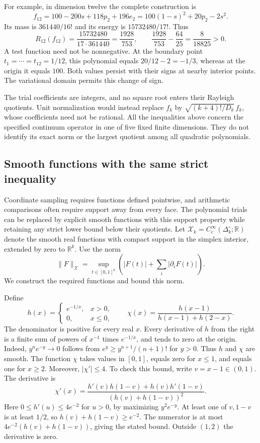 \documentclass[11pt]{article}
\newcommand{\norm}[1]{\lVert #1\rVert}
\begin{document}
For example, in dimension twelve the complete construction is
\[
 f_{12}=100-200s+118p_2+196e_2
       =100(1-s)^2+20p_2-2s^2.
\]
Its mass is $361440/16!$ and its energy is $15732480/17!$.
Thus
\[
 R_{12}(f_{12})=\frac{15732480}{17\cdot361440}
             =\frac{1928}{753},\qquad
 \frac{1928}{753}-\frac{64}{25}=\frac8{18825}>0.
\]
A test function need not be nonnegative.
At the boundary point $t_1=\cdots=t_{12}=1/12$, this polynomial equals
$20/12-2=-1/3$, whereas at the origin it equals $100$.
Both values persist with their signs at nearby interior points.
The variational domain permits this change of sign.

The trial coefficients are integers, and no square root enters their
Rayleigh quotients.  Unit normalization would instead replace $f_k$ by
$\sqrt{(k+4)!/D_k}\,f_k$, whose coefficients need not be rational.
All the inequalities above concern the specified continuum operator in
one of five fixed finite dimensions.  They do not identify its exact norm
or the largest quotient among all quadratic polynomials.


\subsection{Smooth functions with the same strict inequality}

Coordinate sampling requires functions defined pointwise, and arithmetic
comparisons often require support away from every face.
The polynomial trials can be replaced by explicit smooth functions with
this support property while retaining any strict lower bound below their
quotients.
Let $\mathcal X_k=C_c^\infty(\Delta_k^\circ;\mathbb R)$ denote the smooth
real functions with compact support in the simplex interior, extended by
zero to $\mathbb R^k$.
Use the norm
\[
 \norm F_{\mathcal X}
 =\sup_{t\in[0,1]^k}\left(|F(t)|+\sum_i|\partial_iF(t)|\right).
\]
We construct the required functions and bound this norm.

Define
\[
 h(x)=\begin{cases}e^{-1/x},&x>0,\\0,&x\leq0,\end{cases}
 \qquad
 \chi(x)=\frac{h(x-1)}{h(x-1)+h(2-x)}.
\]
The denominator is positive for every real $x$.
Every derivative of $h$ from the right is a finite sum of powers of
$x^{-1}$ times $e^{-1/x}$, and tends to zero at the origin.
Indeed, $y^ne^{-y}\to0$ follows from
$e^y\geq y^{n+1}/(n+1)!$ for $y>0$.
Thus $h$ and $\chi$ are smooth.
The function $\chi$ takes values in $[0,1]$, equals zero for $x\leq1$,
and equals one for $x\geq2$.
Moreover, $|\chi'|\leq4$.
To check this bound, write $v=x-1\in(0,1)$.
The derivative is
\[
 \chi'(x)=\frac{h'(v)h(1-v)+h(v)h'(1-v)}{(h(v)+h(1-v))^2}.
\]
Here $0\leq h'(u)\leq4e^{-2}$ for $u>0$, by maximizing
$y^2e^{-y}$.  At least one of $v,1-v$ is at least $1/2$, so
$h(v)+h(1-v)\geq e^{-2}$.  The numerator is at most
$4e^{-2}(h(v)+h(1-v))$, giving the stated bound.
Outside $(1,2)$ the derivative is zero.
\end{document}
